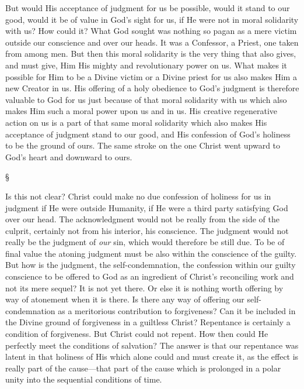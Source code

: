 \documentclass[12pt,a5paper,twoside,titlepage]{book}
\begin{document}
But would His acceptance of judgment for us 
be possible, would it stand to our good, would 
it be of value in God's sight for us, if He 
were not in moral solidarity with us? How 
could it? What God sought was nothing so 
pagan as a mere victim outside our conscience 
and over our heads. It was a Confessor, a 
Priest, one taken from among men. But then 
this moral solidarity is the very thing that 
also gives, and must give, Him His mighty and 
revolutionary power on us. What makes it 
possible for Him to be a Divine victim or a 
Divine priest for us also makes Him a new 
Creator in us. His offering of a holy obedience 
to God's judgment is therefore valuable to God 
for us just because of that moral solidarity 
with us which also makes Him such a moral 
power upon us and in us. His creative regenerative 
action on us is a part of that same 
moral solidarity which also makes His acceptance
of judgment stand to our good, and His 
confession of God's holiness to be the ground 
of ours. The same stroke on the one Christ 
went upward to God's heart and downward 
to ours. 

\begin{center}
\S
\end{center}

Is this not clear? Christ could make no due 
confession of holiness for us in judgment if 
He were outside Humanity, if He were a third 
party satisfying God over our head. The acknowledgment 
would not be really from the 
side of the culprit, certainly not from his interior, 
his conscience. The judgment would not 
really be the judgment of \textit{our} sin, which would 
therefore be still due. To be of final value 
the atoning judgment must be also within the 
conscience of the guilty. But how is the judgment, 
the self-condemnation, the confession within 
our guilty conscience to be offered to God 
as an ingredient of Christ's reconciling work 
and not its mere sequel? It is not yet there. 
Or else it is nothing worth offering by way of 
atonement when it is there. Is there any way of 
offering our self-condemnation as a meritorious 
contribution to forgiveness? Can it be included 
in the Divine ground of forgiveness in a guiltless 
Christ? Repentance is certainly a condition 
of forgiveness. But Christ could not repent. 
How then could He perfectly meet the conditions 
of salvation? The answer is that our 
repentance was latent in that holiness of His 
which alone could and must create it, as the 
effect is really part of the cause---that part of 
the cause which is prolonged in a polar unity 
into the sequential conditions of time. 
\end{document}
